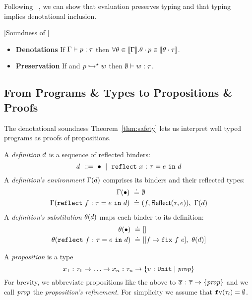 Following \undeclang~\citep{Vazou14}, we can show that
evaluation preserves typing and that typing implies
denotational inclusion.
%
\begin{theorem}{[Soundness of \corelan]}\label{thm:safety}
\begin{itemize}
\item\textbf{Denotations}
If $\Gamma \vdash p : \tau$ then
$\forall \theta\in [\![\Gamma]\!]. {\theta} \cdot {\ensuremath{p}}  \in [\![{\theta} \cdot {\ensuremath{\tau}} ]\!]$.
\item\textbf{Preservation}
If \hastype{\emptyset}{\prog}{\typ}
       and ${p}\hookrightarrow^{\star}{w}$ then $\emptyset \vdash w : \tau$.
\end{itemize}
\end{theorem}

\subsection{From Programs \& Types to Propositions \& Proofs}

The denotational soundness Theorem~\ref{thm:safety}
lets us interpret well typed programs as proofs of
propositions.

A \emph{definition} $d$ is a sequence of reflected binders:
%
$$d \ ::= \ \bullet \ \mid \  {\mathtt{reflect}}\ {x} \ \text{:}\ {\tau} = e\ \mathtt{in}\ {d}$$
%
A \emph{definition's environment} $\Gamma(d)$ comprises
its binders and their reflected types:
%
\begin{align*}
\Gamma(\bullet)                    \ \doteq\  & \emptyset \\
\Gamma({\mathtt{reflect}}\ {f} \ \text{:}\ {\tau} = e\ \mathtt{in}\ {d}) \ \doteq\  & (f, \mathsf{Reflect}(\tau, e)),\ \Gamma(d) \\
\end{align*}
%
A \emph{definition's substitution} $\theta(d)$ maps each binder
to its definition:
%
\begin{align*}
\sto(\bullet)                     \defeq & \emptysto \\
\sto(\erefb{f}{\gtyp}{e}{\defn})  \defeq & \extendsto{f}{\efix{f}\ e}{\sto(\defn)}
\end{align*}

%
A \emph{proposition} is a type
%
$${x_1} \ \text{:}\ {\tau_1} \rightarrow \ldots
  \rightarrow {x_n} \ \text{:}\ {\tau_n}
  \rightarrow \{ {v} \ \text{:}\ {\texttt{Unit}} \mid \mathit{prop} \}$$
%
For brevity, we abbreviate propositions like the above to
%
$\tfun{\overline{x}}{\overline{\typ}}{\ttref{\ppn}}$
%
and we call $\mathit{prop}$ the \emph{proposition's refinement}.
%
For simplicity we assume that $\texttt{fv}({\tau_i}) = \emptyset$.

